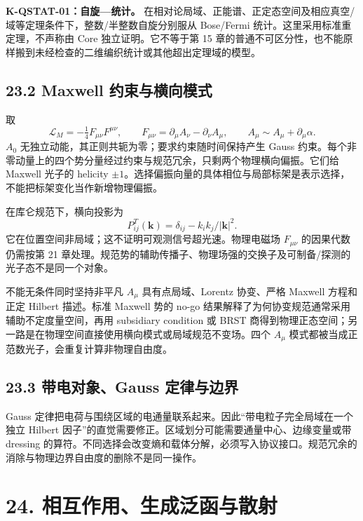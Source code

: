 \documentclass[
  11pt,
  oneside]{book}
\begin{document}
\textbf{K-QSTAT-01：自旋---统计。}
在相对论局域、正能谱、正定态空间及相应真空/域等定理条件下，整数/半整数自旋分别服从
Bose/Fermi 统计。这里采用标准重定理，不声称由 Core 独立证明。它不等于第
15
章的普通不可区分性，也不能原样搬到未经检查的二维编织统计或其他超出定理域的模型。

\hypertarget{maxwell-ux7ea6ux675fux4e0eux6a2aux5411ux6a21ux5f0f}{%
\section{23.2 Maxwell
约束与横向模式}\label{maxwell-ux7ea6ux675fux4e0eux6a2aux5411ux6a21ux5f0f}}

取 \[
\mathcal L_M=-\tfrac14F_{\mu\nu}F^{\mu\nu},\qquad
F_{\mu\nu}=\partial_\mu A_\nu-\partial_\nu A_\mu,
\qquad A_\mu\sim A_\mu+\partial_\mu\alpha.
\] \(A_0\) 无独立动能，其正则共轭为零；要求约束随时间保持产生 Gauss
约束。每个非零动量上的四个势分量经过约束与规范冗余，只剩两个物理横向偏振。它们给
Maxwell 光子的 helicity
\(\pm1\)。选择偏振向量的具体相位与局部标架是表示选择，不能把标架变化当作新增物理偏振。

在库仑规范下，横向投影为 \[
P^T_{ij}(\mathbf k)=\delta_{ij}-k_i k_j/|\mathbf k|^2.
\] 它在位置空间非局域；这不证明可观测信号超光速。物理电磁场
\(F_{\mu\nu}\) 的因果代数仍需按第 21
章处理。规范势的辅助传播子、物理场强的交换子及可制备/探测的光子态不是同一个对象。

不能无条件同时坚持非平凡 \(A_\mu\) 具有点局域、Lorentz 协变、严格
Maxwell 方程和正定 Hilbert 描述。标准 Maxwell 势的 no-go
结果解释了为何协变规范通常采用辅助不定度量空间，再用 subsidiary
condition 或 BRST
商得到物理正态空间；另一路是在物理空间直接使用横向模式或局域规范不变场。四个
\(A_\mu\) 模式都被当成正范数光子，会重复计算非物理自由度。

\hypertarget{ux5e26ux7535ux5bf9ux8c61gauss-ux5b9aux5f8bux4e0eux8fb9ux754c}{%
\section{23.3 带电对象、Gauss
定律与边界}\label{ux5e26ux7535ux5bf9ux8c61gauss-ux5b9aux5f8bux4e0eux8fb9ux754c}}

Gauss
定律把电荷与围绕区域的电通量联系起来。因此``带电粒子完全局域在一个独立
Hilbert 因子''的直觉需要修正。区域划分可能需要通量中心、边缘变量或带
dressing
的算符。不同选择会改变熵和载体分解，必须写入协议接口。规范冗余的消除与物理边界自由度的删除不是同一操作。

\hypertarget{ch-24}{%
\chapter{24. 相互作用、生成泛函与散射}\label{ch-24}}
\end{document}
